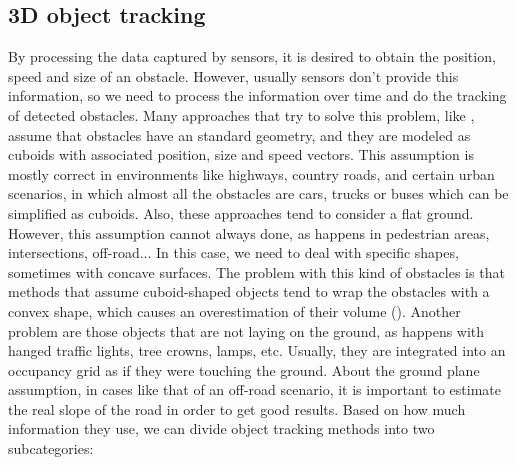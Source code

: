 
\subsection{3D object tracking}\label{ch:chapter00_02_05}

By processing the data captured by sensors, it is desired to obtain the position, speed and size of an obstacle. However, usually sensors don't provide this information, so we need to process the information over time and do the tracking of detected obstacles. Many approaches that try to solve this problem, like \cite{danescu2012particle}, assume that obstacles have an standard geometry, and they are modeled as cuboids with associated position, size and speed vectors. This assumption is mostly correct in environments like highways, country roads, and certain urban scenarios, in which almost all the obstacles are cars, trucks or buses which can be simplified as cuboids. Also, these approaches tend to consider a flat ground.
However, this assumption cannot always done, as happens in pedestrian areas, intersections, off-road... In this case, we need to deal with specific shapes, sometimes with concave surfaces. The problem with this kind of obstacles is that methods that assume cuboid-shaped objects tend to wrap the obstacles with a convex shape, which causes an overestimation of their volume (\cite{broggi2013}). Another problem are those objects that are not laying on the ground, as happens with hanged traffic lights, tree crowns, lamps, etc. Usually, they are integrated into an occupancy grid as if they were touching the ground. About the ground plane assumption, in cases like that of an off-road scenario, it is important to estimate the real slope of the road in order to get good results.
Based on how much information they use, we can divide object tracking methods into two subcategories:
